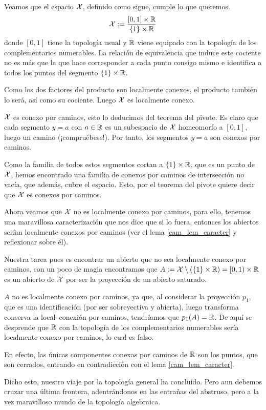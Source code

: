 \begin{exa}
	Veamos que el espacio $\mathcal{X}$, definido como sigue, cumple lo que queremos. \[\mathcal{X}:=\frac{[0,1]\times \mathbb{R}}{\{1\}\times \mathbb{R}}\] donde $[0,1]$ tiene la topología usual y $\mathbb{R}$ viene equipado con la topología de los complementarios numerables. La relación de equivalencia que induce este cociente no es más que la que hace corresponder a cada punto consigo mismo e identifica a todos los puntos del segmento $\{1\}\times\mathbb{R}$.
	
	Como los dos factores del producto son localmente conexos, el producto también lo será, así como su cociente. Luego $\mathcal{X}$ es localmente conexo.
	
	$\mathcal{X}$ es conexo por caminos, esto lo deducimos del teorema del pivote. Es claro que cada segmento $y=a$ con $a\in\mathbb{R}$ es un subespacio de $\mathcal{X}$ homeomorfo a $[0,1]$, luego un camino (¡compruébese!). Por tanto, los segmentos $y=a$ son conexos por caminos.
	
	Como la familia de todos estos segmentos cortan a $\{1\}\times \mathbb{R}$, que es un punto de $\mathcal{X}$, hemos encontrado una familia de conexos por caminos de intersección no vacía, que además, cubre el espacio. Esto, por el teorema del pivote quiere decir que $\mathcal{X}$ es conexos por caminos.
	
	Ahora veamos que $\mathcal{X}$ no es localmente conexo por caminos, para ello, tenemos una maravillosa caracterización que nos dice que si lo fuera, entonces los abiertos serían localmente conexos por caminos (ver el lema \ref{cam_lem_caracter} y reflexionar sobre él).
	
	Nuestra tarea pues es encontrar un abierto que no sea localmente conexo por caminos, con un poco de magia encontramos que $A:=\mathcal{X}\setminus (\{1\}\times \mathbb{R})=[0,1)\times\mathbb{R}$ es un abierto de $\mathcal{X}$ por ser la proyección de un abierto saturado.
	
	$A$ no es localmente conexo por caminos, ya que, al considerar la proyección $p_1$, que es una identificación (por ser sobreyectiva y abierta), luego transforma conserva la local--conexión por caminos, tendríamos que $p_1(A)=\mathbb{R}$. De aquí se desprende que $\mathbb{R}$ con la topología de los complementarios numerables sería localmente conexo por caminos, lo cual es falso.
	
	En efecto, las únicas componentes conexas por caminos de $\mathbb{R}$ son los puntos, que son cerrados, entrando en contradicción con el lema \ref{cam_lem_caracter}.
\end{exa}
Dicho esto, nuestro viaje por la topología general ha concluido. Pero aun debemos cruzar una última frontera, adentrándonos en las entrañas del abstruso, pero a la vez maravilloso mundo de la topología algebraica.
